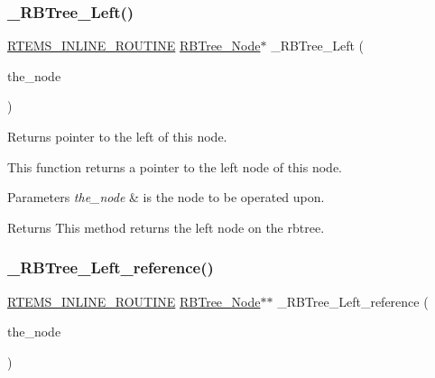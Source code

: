 \subsubsection{\texorpdfstring{\_RBTree\_Left()}{\_RBTree\_Left()}}
{\footnotesize\ttfamily \mbox{\hyperlink{group__RTEMSScoreBaseDefs_gac216239df231d5dbd15e3520b0b9313f}{R\+T\+E\+M\+S\+\_\+\+I\+N\+L\+I\+N\+E\+\_\+\+R\+O\+U\+T\+I\+NE}} \mbox{\hyperlink{structRBTree__Node}{R\+B\+Tree\+\_\+\+Node}}$\ast$ \+\_\+\+R\+B\+Tree\+\_\+\+Left (\begin{DoxyParamCaption}\item[{const \mbox{\hyperlink{structRBTree__Node}{R\+B\+Tree\+\_\+\+Node}} $\ast$}]{the\+\_\+node }\end{DoxyParamCaption})}



Returns pointer to the left of this node. 

This function returns a pointer to the left node of this node.


\begin{DoxyParams}{Parameters}
{\em the\+\_\+node} & is the node to be operated upon.\\
\hline
\end{DoxyParams}
\begin{DoxyReturn}{Returns}
This method returns the left node on the rbtree. 
\end{DoxyReturn}
\mbox{\label{group__RTEMSScoreRBTree_ga3a992a2f539e70293f35e11d5fdc6be9}} 
\subsubsection{\texorpdfstring{\_RBTree\_Left\_reference()}{\_RBTree\_Left\_reference()}}
{\footnotesize\ttfamily \mbox{\hyperlink{group__RTEMSScoreBaseDefs_gac216239df231d5dbd15e3520b0b9313f}{R\+T\+E\+M\+S\+\_\+\+I\+N\+L\+I\+N\+E\+\_\+\+R\+O\+U\+T\+I\+NE}} \mbox{\hyperlink{structRBTree__Node}{R\+B\+Tree\+\_\+\+Node}}$\ast$$\ast$ \+\_\+\+R\+B\+Tree\+\_\+\+Left\+\_\+reference (\begin{DoxyParamCaption}\item[{\mbox{\hyperlink{structRBTree__Node}{R\+B\+Tree\+\_\+\+Node}} $\ast$}]{the\+\_\+node }\end{DoxyParamCaption})}



